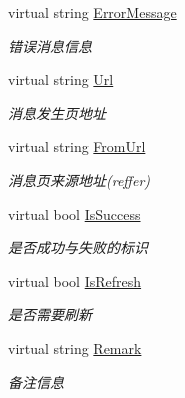 \begin{DoxyCompactItemize}
virtual string \hyperlink{class_x_c_l_net_tools_1_1_message_1_1_message_model_ada401a9778626e835f620eace9dbece1}{Error\+Message}
\begin{DoxyCompactList}\small\item\em 错误消息信息 \end{DoxyCompactList}\item 
virtual string \hyperlink{class_x_c_l_net_tools_1_1_message_1_1_message_model_a35cd14fdd9bbc8dea4c151c00d538755}{Url}
\begin{DoxyCompactList}\small\item\em 消息发生页地址 \end{DoxyCompactList}\item 
virtual string \hyperlink{class_x_c_l_net_tools_1_1_message_1_1_message_model_a36e0a2784c189c86b33b76ceca539a28}{From\+Url}
\begin{DoxyCompactList}\small\item\em 消息页来源地址(reffer) \end{DoxyCompactList}\item 
virtual bool \hyperlink{class_x_c_l_net_tools_1_1_message_1_1_message_model_a3881fb689ec30bfd21672b010a130675}{Is\+Success}
\begin{DoxyCompactList}\small\item\em 是否成功与失败的标识 \end{DoxyCompactList}\item 
virtual bool \hyperlink{class_x_c_l_net_tools_1_1_message_1_1_message_model_a07c51819ac5836a7839b778c2cc62ba5}{Is\+Refresh}
\begin{DoxyCompactList}\small\item\em 是否需要刷新 \end{DoxyCompactList}\item 
virtual string \hyperlink{class_x_c_l_net_tools_1_1_message_1_1_message_model_a933d98b3a93f2aefeaaf2d66940133a9}{Remark}
\begin{DoxyCompactList}\small\item\em 备注信息 \end{DoxyCompactList}\item 

\end{DoxyCompactItemize}

